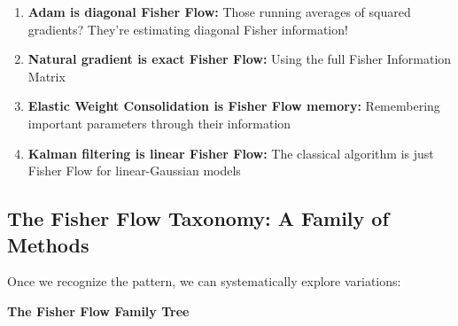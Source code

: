 \documentclass[11pt]{article}
\begin{document}
\begin{enumerate}
\item \textbf{Adam is diagonal Fisher Flow:} Those running averages of squared gradients? They're estimating diagonal Fisher information!
\item \textbf{Natural gradient is exact Fisher Flow:} Using the full Fisher Information Matrix
\item \textbf{Elastic Weight Consolidation is Fisher Flow memory:} Remembering important parameters through their information
\item \textbf{Kalman filtering is linear Fisher Flow:} The classical algorithm is just Fisher Flow for linear-Gaussian models
\end{enumerate}

\subsection{The Fisher Flow Taxonomy: A Family of Methods}

Once we recognize the pattern, we can systematically explore variations:

\begin{center}
\textbf{The Fisher Flow Family Tree}
\end{center}
\end{document}
